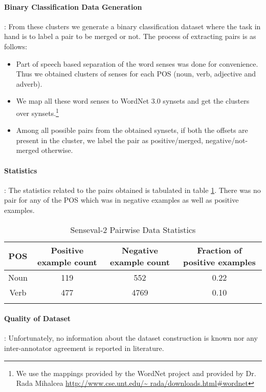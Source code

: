 \paragraph{Binary Classification Data Generation}: From these clusters we generate a binary classification dataset where the task in hand is to label a pair to be merged or not. 
The process of extracting pairs is as follows: 
\begin{itemize}
\item Part of speech based separation of the word senses was done for convenience. Thus we obtained clusters of senses for each POS (noun, verb, adjective and adverb).
\item We map all these word senses to WordNet 3.0 synsets and get the clusters over synsets.\footnote{We use the mappings provided by the WordNet project and provided by Dr. Rada Mihalcea \url{http://www.cse.unt.edu/~ rada/downloads.html\#wordnet}}
\item Among all possible pairs from the obtained synsets, if both the offsets are present in the cluster, we label the pair as positive/merged, negative/not-merged otherwise.
\end{itemize}

\paragraph{Statistics}: 
The statistics related to the pairs obtained is tabulated in table \ref{tab:senseval2stats}. There was no pair for any of the POS which was in negative examples as well as positive examples.

\begin{center}
\begin{longtable}{| c | c | c | c |}  
\hline
POS & Positive example count & Negative example count & Fraction of positive examples \\ \hline
Noun & 119 & 552 & 0.22 \\ \hline
Verb & 477 & 4769 & 0.10 \\ \hline
\caption{Senseval-2 Pairwise Data Statistics}
\label{tab:senseval2stats}
\end{longtable}
\end{center}


\paragraph{Quality of Dataset}:
Unfortunately, no information about the dataset construction is known nor any inter-annotator agreement is reported in literature.

